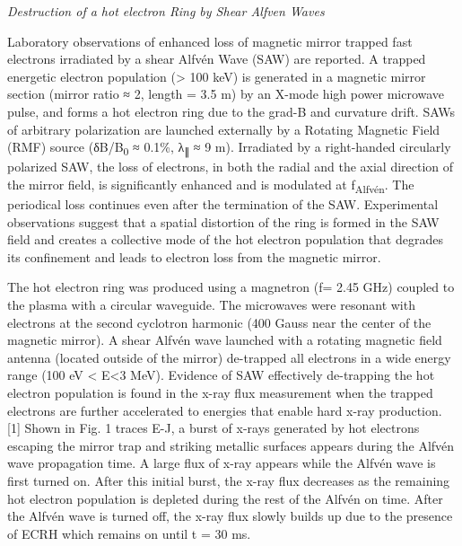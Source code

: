 \documentclass[11pt]{article}
\begin{document}
\begin{description}
\emph{Destruction of a hot electron Ring by Shear Alfven Waves}

Laboratory observations of enhanced loss of magnetic mirror trapped fast
electrons irradiated by a shear Alfvén Wave (SAW) are reported. A
trapped energetic electron population (\textgreater{} 100 keV) is
generated in a magnetic mirror section (mirror ratio ≈ 2, length = 3.5
m) by an X-mode high power microwave pulse, and forms a hot electron
ring due to the grad-B and curvature drift. SAWs of arbitrary
polarization are launched externally by a Rotating Magnetic Field (RMF)
source (δB/B\textsubscript{0} ≈ 0.1\%, λ\textsubscript{∥} ≈ 9 m).
Irradiated by a right-handed circularly polarized SAW, the loss of
electrons, in both the radial and the axial direction of the mirror
field, is significantly enhanced and is modulated at
f\textsubscript{Alfvén}. The periodical loss continues even after the
termination of the SAW. Experimental observations suggest that a spatial
distortion of the ring is formed in the SAW field and creates a
collective mode of the hot electron population that degrades its
confinement and leads to electron loss from the magnetic mirror.

The hot electron ring was produced using a magnetron (f= 2.45 GHz)
coupled to the plasma with a circular waveguide. The microwaves were
resonant with electrons at the second cyclotron harmonic (400 Gauss near
the center of the magnetic mirror). A shear Alfvén wave launched with a
rotating magnetic field antenna (located outside of the mirror)
de-trapped all electrons in a wide energy range (100 eV \textless{}
E\textless{}3 MeV). Evidence of SAW effectively de-trapping the hot
electron population is found in the x-ray flux measurement when the
trapped electrons are further accelerated to energies that enable hard
x-ray production. {[}1{]} Shown in Fig. 1 traces E-J, a burst of x-rays
generated by hot electrons escaping the mirror trap and striking
metallic surfaces appears during the Alfvén wave propagation time. A
large flux of x-ray appears while the Alfvén wave is first turned on.
After this initial burst, the x-ray flux decreases as the remaining hot
electron population is depleted during the rest of the Alfvén on time.
After the Alfvén wave is turned off, the x-ray flux slowly builds up due
to the presence of ECRH which remains on until t = 30 ms.


\end{description}
\end{document}
